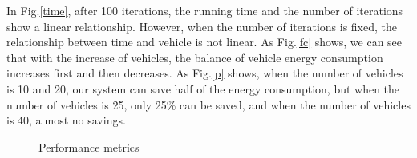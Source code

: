 \documentclass[conference]{IEEEtran}
\begin{document}
In Fig.\ref{time}, after 100 iterations, the running time and the number of iterations show a linear relationship. However, when the number of iterations is fixed, the relationship between time and vehicle is not linear. 
As Fig.\ref{fc} shows, we can see that with the increase of vehicles, the balance of vehicle energy consumption increases first and then decreases. 
As Fig.\ref{p} shows, when the number of vehicles is 10 and 20, our system can save half of the energy consumption, but when the number of vehicles is 25, only 25\% can be saved, and when the number of vehicles is 40, almost no savings. 
\begin{figure}[htbp]
	\centering
	\quad
	\caption{Performance metrics}
\end{figure}
\end{document}
